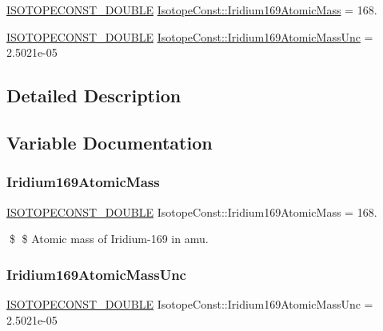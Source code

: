 \begin{DoxyCompactItemize}
\item 
\mbox{\hyperlink{group___isotope_const-_macros_ga8f45a7272ce02c0b4c65c44636ed719a}{I\+S\+O\+T\+O\+P\+E\+C\+O\+N\+S\+T\+\_\+\+D\+O\+U\+B\+LE}} \mbox{\hyperlink{group___isotope_const-_iridium-_ir169_ga73fe16ade5716cfc8bbc8a6f7961e614}{Isotope\+Const\+::\+Iridium169\+Atomic\+Mass}} = 168.
\item 
\mbox{\hyperlink{group___isotope_const-_macros_ga8f45a7272ce02c0b4c65c44636ed719a}{I\+S\+O\+T\+O\+P\+E\+C\+O\+N\+S\+T\+\_\+\+D\+O\+U\+B\+LE}} \mbox{\hyperlink{group___isotope_const-_iridium-_ir169_ga818ae9c33577eb239a0341f563ffa7e8}{Isotope\+Const\+::\+Iridium169\+Atomic\+Mass\+Unc}} = 2.\+5021e-\/05
\end{DoxyCompactItemize}


\subsection{Detailed Description}


\subsection{Variable Documentation}
\mbox{\label{group___isotope_const-_iridium-_ir169_ga73fe16ade5716cfc8bbc8a6f7961e614}} 
\subsubsection{\texorpdfstring{Iridium169\+Atomic\+Mass}{Iridium169AtomicMass}}
{\footnotesize\ttfamily \mbox{\hyperlink{group___isotope_const-_macros_ga8f45a7272ce02c0b4c65c44636ed719a}{I\+S\+O\+T\+O\+P\+E\+C\+O\+N\+S\+T\+\_\+\+D\+O\+U\+B\+LE}} Isotope\+Const\+::\+Iridium169\+Atomic\+Mass = 168.}

\$ \$ Atomic mass of Iridium-\/169 in amu. \mbox{\label{group___isotope_const-_iridium-_ir169_ga818ae9c33577eb239a0341f563ffa7e8}} 
\subsubsection{\texorpdfstring{Iridium169\+Atomic\+Mass\+Unc}{Iridium169AtomicMassUnc}}
{\footnotesize\ttfamily \mbox{\hyperlink{group___isotope_const-_macros_ga8f45a7272ce02c0b4c65c44636ed719a}{I\+S\+O\+T\+O\+P\+E\+C\+O\+N\+S\+T\+\_\+\+D\+O\+U\+B\+LE}} Isotope\+Const\+::\+Iridium169\+Atomic\+Mass\+Unc = 2.\+5021e-\/05}

